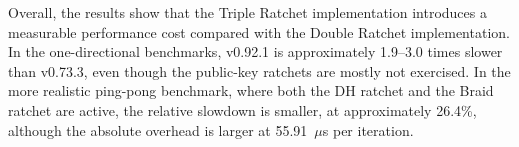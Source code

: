 Overall, the results show that the Triple Ratchet implementation introduces a measurable performance cost compared with the Double Ratchet implementation. In the one-directional benchmarks, v0.92.1 is approximately 1.9--3.0 times slower than v0.73.3, even though the public-key ratchets are mostly not exercised. In the more realistic ping-pong benchmark, where both the DH ratchet and the Braid ratchet are active, the relative slowdown is smaller, at approximately 26.4\%, although the absolute overhead is larger at 55.91~$\mu$s per iteration.


